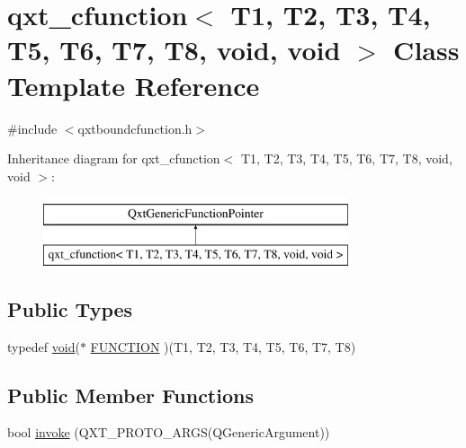 \hypertarget{classqxt__cfunction_3_01_t1_00_01_t2_00_01_t3_00_01_t4_00_01_t5_00_01_t6_00_01_t7_00_01_t8_00_01void_00_01void_01_4}{\section{qxt\-\_\-cfunction$<$ T1, T2, T3, T4, T5, T6, T7, T8, void, void $>$ Class Template Reference}
\label{classqxt__cfunction_3_01_t1_00_01_t2_00_01_t3_00_01_t4_00_01_t5_00_01_t6_00_01_t7_00_01_t8_00_01void_00_01void_01_4}
}


{\ttfamily \#include $<$qxtboundcfunction.\-h$>$}

Inheritance diagram for qxt\-\_\-cfunction$<$ T1, T2, T3, T4, T5, T6, T7, T8, void, void $>$\-:\begin{figure}[H]
\begin{center}
\leavevmode
\includegraphics[height=2.000000cm]{classqxt__cfunction_3_01_t1_00_01_t2_00_01_t3_00_01_t4_00_01_t5_00_01_t6_00_01_t7_00_01_t8_00_01void_00_01void_01_4}
\end{center}
\end{figure}
\subsection*{Public Types}
\begin{DoxyCompactItemize}
\item 
typedef \hyperlink{group___u_a_v_objects_plugin_ga444cf2ff3f0ecbe028adce838d373f5c}{void}($\ast$ \hyperlink{classqxt__cfunction_3_01_t1_00_01_t2_00_01_t3_00_01_t4_00_01_t5_00_01_t6_00_01_t7_00_01_t8_00_01void_00_01void_01_4_a1e8d33330533f752bf5ed50e5508229c}{F\-U\-N\-C\-T\-I\-O\-N} )(T1, T2, T3, T4, T5, T6, T7, T8)
\end{DoxyCompactItemize}
\subsection*{Public Member Functions}
\begin{DoxyCompactItemize}
\item 
bool \hyperlink{classqxt__cfunction_3_01_t1_00_01_t2_00_01_t3_00_01_t4_00_01_t5_00_01_t6_00_01_t7_00_01_t8_00_01void_00_01void_01_4_a75dd7aaf40907c08a78605b5dca230f9}{invoke} (Q\-X\-T\-\_\-\-P\-R\-O\-T\-O\-\_\-A\-R\-G\-S(Q\-Generic\-Argument))
\end{DoxyCompactItemize}
